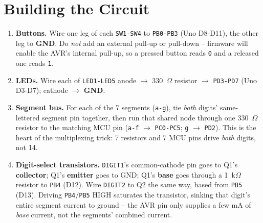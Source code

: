 \documentclass[11pt]{article}
\begin{document}
\section*{Building the Circuit}
\begin{enumerate}[leftmargin=*,nosep]
  \item \textbf{Buttons.} Wire one leg of each \texttt{SW1-SW4} to \texttt{PB0-PB3}
        (Uno D8-D11), the other leg to \textbf{GND}. Do \emph{not} add an external
        pull-up or pull-down -- firmware will enable the AVR's internal pull-up, so a
        pressed button reads \texttt{0} and a released one reads \texttt{1}.
  \item \textbf{LEDs.} Wire each of \texttt{LED1-LED5} anode $\to$ 330~$\Omega$
        resistor $\to$ \texttt{PD3-PD7} (Uno D3-D7); cathode $\to$ \textbf{GND}.
  \item \textbf{Segment bus.} For each of the 7 segments (\texttt{a-g}), tie
        \emph{both} digits' same-lettered segment pin together, then run that shared
        node through one 330~$\Omega$ resistor to the matching MCU pin
        (\texttt{a-f} $\to$ \texttt{PC0-PC5}; \texttt{g} $\to$ \texttt{PD2}). This is
        the heart of the multiplexing trick: 7 resistors and 7 MCU pins drive
        \emph{both} digits, not 14.
  \item \textbf{Digit-select transistors.} \texttt{DIGIT1}'s common-cathode pin goes
        to Q1's \textbf{collector}; Q1's \textbf{emitter} goes to GND; Q1's
        \textbf{base} goes through a 1~k$\Omega$ resistor to \texttt{PB4} (D12).
        Wire \texttt{DIGIT2} to Q2 the same way, based from \texttt{PB5} (D13).
        Driving \texttt{PB4}/\texttt{PB5} HIGH saturates the transistor, sinking that
        digit's entire segment current to ground -- the AVR pin only supplies a few
        mA of \emph{base} current, not the segments' combined current.
\end{enumerate}
\end{document}
